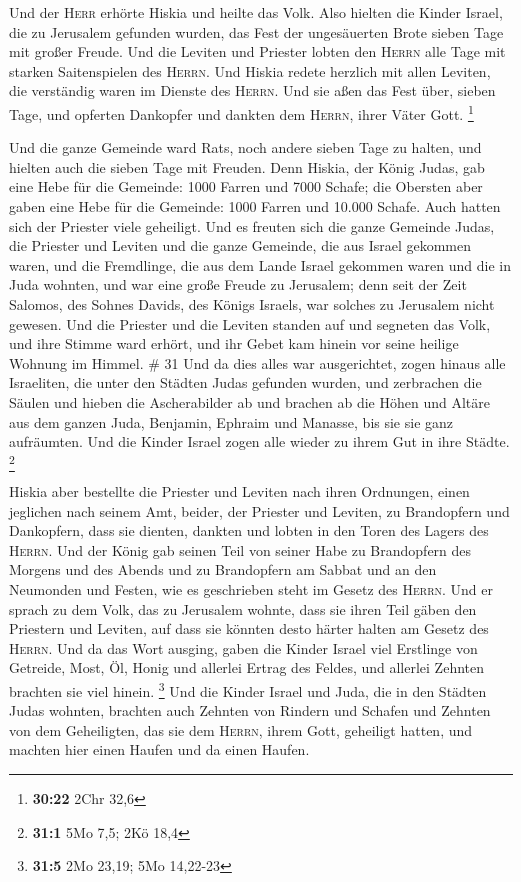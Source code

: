  Und der \textsc{Herr} erhörte Hiskia und heilte das
Volk.  Also hielten die Kinder Israel, die zu Jerusalem
gefunden wurden, das Fest der ungesäuerten Brote sieben Tage mit großer
Freude. Und die Leviten und Priester lobten den \textsc{Herrn} alle Tage
mit starken Saitenspielen des \textsc{Herrn}.  Und Hiskia
redete herzlich mit allen Leviten, die verständig waren im Dienste des
\textsc{Herrn}. Und sie aßen das Fest über, sieben Tage, und opferten
Dankopfer und dankten dem \textsc{Herrn}, ihrer Väter Gott. \footnote{\textbf{30:22}
  2Chr 32,6}

 Und die ganze Gemeinde ward Rats, noch andere sieben
Tage zu halten, und hielten auch die sieben Tage mit Freuden.
 Denn Hiskia, der König Judas, gab eine Hebe für die
Gemeinde: 1000 Farren und 7000 Schafe; die Obersten aber gaben eine Hebe
für die Gemeinde: 1000 Farren und 10.000 Schafe. Auch hatten sich der
Priester viele geheiligt.  Und es freuten sich die ganze
Gemeinde Judas, die Priester und Leviten und die ganze Gemeinde, die aus
Israel gekommen waren, und die Fremdlinge, die aus dem Lande Israel
gekommen waren und die in Juda wohnten,  und war eine
große Freude zu Jerusalem; denn seit der Zeit Salomos, des Sohnes
Davids, des Königs Israels, war solches zu Jerusalem nicht gewesen.
 Und die Priester und die Leviten standen auf und
segneten das Volk, und ihre Stimme ward erhört, und ihr Gebet kam hinein
vor seine heilige Wohnung im Himmel. \# 31  Und da dies
alles war ausgerichtet, zogen hinaus alle Israeliten, die unter den
Städten Judas gefunden wurden, und zerbrachen die Säulen und hieben die
Ascherabilder ab und brachen ab die Höhen und Altäre aus dem ganzen
Juda, Benjamin, Ephraim und Manasse, bis sie sie ganz aufräumten. Und
die Kinder Israel zogen alle wieder zu ihrem Gut in ihre Städte.
\footnote{\textbf{31:1} 5Mo 7,5; 2Kö 18,4}

 Hiskia aber bestellte die Priester und Leviten nach ihren
Ordnungen, einen jeglichen nach seinem Amt, beider, der Priester und
Leviten, zu Brandopfern und Dankopfern, dass sie dienten, dankten und
lobten in den Toren des Lagers des \textsc{Herrn}.  Und
der König gab seinen Teil von seiner Habe zu Brandopfern des Morgens und
des Abends und zu Brandopfern am Sabbat und an den Neumonden und Festen,
wie es geschrieben steht im Gesetz des \textsc{Herrn}. 
Und er sprach zu dem Volk, das zu Jerusalem wohnte, dass sie ihren Teil
gäben den Priestern und Leviten, auf dass sie könnten desto härter
halten am Gesetz des \textsc{Herrn}.  Und da das Wort
ausging, gaben die Kinder Israel viel Erstlinge von Getreide, Most, Öl,
Honig und allerlei Ertrag des Feldes, und allerlei Zehnten brachten sie
viel hinein. \footnote{\textbf{31:5} 2Mo 23,19; 5Mo 14,22-23}
 Und die Kinder Israel und Juda, die in den Städten Judas
wohnten, brachten auch Zehnten von Rindern und Schafen und Zehnten von
dem Geheiligten, das sie dem \textsc{Herrn}, ihrem Gott, geheiligt
hatten, und machten hier einen Haufen und da einen Haufen.

